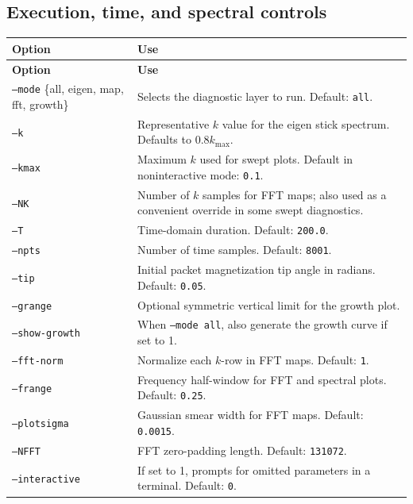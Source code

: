 \documentclass[11pt]{article}
\begin{document}
\subsection{Execution, time, and spectral controls}
\begin{longtable}{L{0.28\textwidth}L{0.64\textwidth}}
\toprule
\textbf{Option} & \textbf{Use} \\
\midrule
\endfirsthead
\toprule
\textbf{Option} & \textbf{Use} \\
\midrule
\endhead
\texttt{--mode} \{all, eigen, map, fft, growth\} & Selects the diagnostic layer to run. Default: \texttt{all}. \\
\texttt{--k} & Representative \(k\) value for the eigen stick spectrum. Defaults to \(0.8 k_{\max}\). \\
\texttt{--kmax} & Maximum \(k\) used for swept plots. Default in noninteractive mode: \texttt{0.1}. \\
\texttt{--NK} & Number of \(k\) samples for FFT maps; also used as a convenient override in some swept diagnostics. \\
\texttt{--T} & Time-domain duration. Default: \texttt{200.0}. \\
\texttt{--npts} & Number of time samples. Default: \texttt{8001}. \\
\texttt{--tip} & Initial packet magnetization tip angle in radians. Default: \texttt{0.05}. \\
\texttt{--grange} & Optional symmetric vertical limit for the growth plot. \\
\texttt{--show-growth} & When \texttt{--mode all}, also generate the growth curve if set to 1. \\
\texttt{--fft-norm} & Normalize each \(k\)-row in FFT maps. Default: \texttt{1}. \\
\texttt{--frange} & Frequency half-window for FFT and spectral plots. Default: \texttt{0.25}. \\
\texttt{--plotsigma} & Gaussian smear width for FFT maps. Default: \texttt{0.0015}. \\
\texttt{--NFFT} & FFT zero-padding length. Default: \texttt{131072}. \\
\texttt{--interactive} & If set to 1, prompts for omitted parameters in a terminal. Default: \texttt{0}. \\
\bottomrule
\end{longtable}
\end{document}
